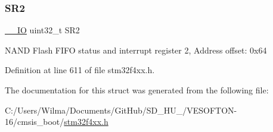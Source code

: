 \subsubsection{\texorpdfstring{S\+R2}{SR2}}
{\footnotesize\ttfamily \hyperlink{group___c_m_s_i_s__core__definitions_gaec43007d9998a0a0e01faede4133d6be}{\+\_\+\+\_\+\+IO} uint32\+\_\+t S\+R2}

N\+A\+ND Flash F\+I\+FO status and interrupt register 2, Address offset\+: 0x64 

Definition at line 611 of file stm32f4xx.\+h.



The documentation for this struct was generated from the following file\+:\begin{DoxyCompactItemize}
\item 
C\+:/\+Users/\+Wilma/\+Documents/\+Git\+Hub/\+S\+D\+\_\+\+H\+U\+\_/\+V\+E\+S\+O\+F\+T\+O\+N-\/16/cmsis\+\_\+boot/\hyperlink{stm32f4xx_8h}{stm32f4xx.\+h}\end{DoxyCompactItemize}
